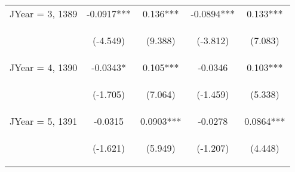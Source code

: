 \documentclass[]{standalone}
\begin{document}
\begin{tabular}{lcccc}
    JYear = 3, 1389  & -0.0917***                                     & 0.136***                                       & -0.0894***                                     & 0.133***                                       \\
    \vspace{4pt}     & \begin{footnotesize}(-4.549)\end{footnotesize} & \begin{footnotesize}(9.388)\end{footnotesize}  & \begin{footnotesize}(-3.812)\end{footnotesize} & \begin{footnotesize}(7.083)\end{footnotesize}  \\
    JYear = 4, 1390  & -0.0343*                                       & 0.105***                                       & -0.0346                                        & 0.103***                                       \\
    \vspace{4pt}     & \begin{footnotesize}(-1.705)\end{footnotesize} & \begin{footnotesize}(7.064)\end{footnotesize}  & \begin{footnotesize}(-1.459)\end{footnotesize} & \begin{footnotesize}(5.338)\end{footnotesize}  \\
    JYear = 5, 1391  & -0.0315                                        & 0.0903***                                      & -0.0278                                        & 0.0864***                                      \\
    \vspace{4pt}     & \begin{footnotesize}(-1.621)\end{footnotesize} & \begin{footnotesize}(5.949)\end{footnotesize}  & \begin{footnotesize}(-1.207)\end{footnotesize} & \begin{footnotesize}(4.448)\end{footnotesize}  \\

\end{tabular}
\end{document}

